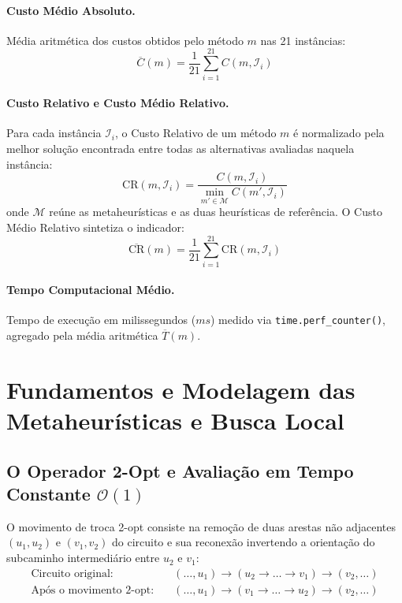 \documentclass[12pt, a4paper]{article}
\begin{document}
\paragraph{Custo Médio Absoluto.} Média aritmética dos custos obtidos pelo método $m$ nas 21 instâncias:
\begin{equation}
    \overline{C}(m) = \frac{1}{21} \sum_{i=1}^{21} C(m, \mathcal{I}_i)
\end{equation}

\paragraph{Custo Relativo e Custo Médio Relativo.} Para cada instância $\mathcal{I}_i$, o Custo Relativo de um método $m$ é normalizado pela melhor solução encontrada entre todas as alternativas avaliadas naquela instância:
\begin{equation}
    \mathrm{CR}(m, \mathcal{I}_i) = \frac{C(m, \mathcal{I}_i)}{\displaystyle\min_{m' \in \mathcal{M}} C(m', \mathcal{I}_i)}
\end{equation}
onde $\mathcal{M}$ reúne as metaheurísticas e as duas heurísticas de referência. O Custo Médio Relativo sintetiza o indicador:
\begin{equation}
    \overline{\mathrm{CR}}(m) = \frac{1}{21} \sum_{i=1}^{21} \mathrm{CR}(m, \mathcal{I}_i)
\end{equation}

\paragraph{Tempo Computacional Médio.} Tempo de execução em milissegundos ($ms$) medido via \texttt{time.perf\_counter()}, agregado pela média aritmética $\overline{T}(m)$.

\section{Fundamentos e Modelagem das Metaheurísticas e Busca Local}

\subsection{O Operador 2-Opt e Avaliação em Tempo Constante \texorpdfstring{$\mathcal{O}(1)$}{O(1)}}

O movimento de troca 2-opt \cite{croes1958, lin1965} consiste na remoção de duas arestas não adjacentes $(u_1, u_2)$ e $(v_1, v_2)$ do circuito e sua reconexão invertendo a orientação do subcaminho intermediário entre $u_2$ e $v_1$:
\begin{align}
    \text{Circuito original:} &\quad (\dots, u_1) \to (u_2 \to \dots \to v_1) \to (v_2, \dots) \\
    \text{Após o movimento 2-opt:} &\quad (\dots, u_1) \to (v_1 \to \dots \to u_2) \to (v_2, \dots)
\end{align}
\end{document}
